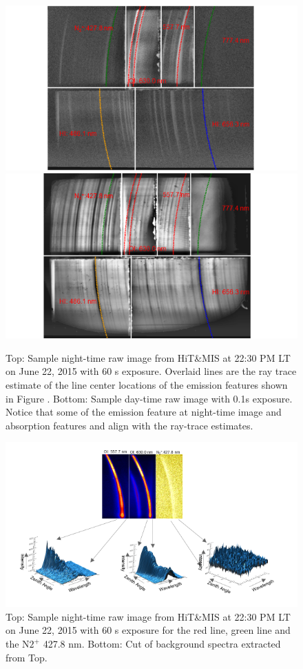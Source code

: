 \documentclass[crop=false,class=mitthesis,oneside,font=12pt]{standalone}
\begin{document}
\begin{figure}[H]
	\centering\includegraphics[width=32pc]{night_hm.png}
    \centering\includegraphics[width=32pc]{day_hm.png}
	\caption{Top: Sample night-time raw image from HiT\&MIS at 22:30 PM LT on June 22, 2015 with 60 s exposure. Overlaid lines are the ray trace estimate of the line center locations of the emission features shown in Figure . Bottom: Sample day-time raw image with 0.1s exposure. Notice that some of the emission feature at night-time image and absorption features and align with the ray-trace estimates.}
	\label{fig:raw_line}
\end{figure}

\begin{figure}[H]
	\centering\includegraphics[width=35pc]{cut_hm.png}
	\caption{Top: Sample night-time raw image from HiT\&MIS at 22:30 PM LT on June 22, 2015 with 60 s exposure for the red line, green line and the N$2^+$ 427.8 nm. Bottom: Cut of background spectra extracted from Top.}
	\label{fig:cut_hm}
\end{figure}
\end{document}

